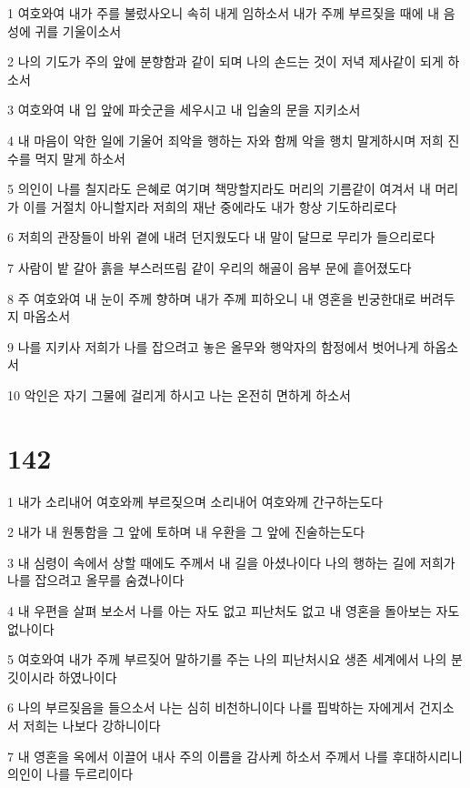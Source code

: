 \par 1 여호와여 내가 주를 불렀사오니 속히 내게 임하소서 내가 주께 부르짖을 때에 내 음성에 귀를 기울이소서
\par 2 나의 기도가 주의 앞에 분향함과 같이 되며 나의 손드는 것이 저녁 제사같이 되게 하소서
\par 3 여호와여 내 입 앞에 파숫군을 세우시고 내 입술의 문을 지키소서
\par 4 내 마음이 악한 일에 기울어 죄악을 행하는 자와 함께 악을 행치 말게하시며 저희 진수를 먹지 말게 하소서
\par 5 의인이 나를 칠지라도 은혜로 여기며 책망할지라도 머리의 기름같이 여겨서 내 머리가 이를 거절치 아니할지라 저희의 재난 중에라도 내가 항상 기도하리로다
\par 6 저희의 관장들이 바위 곁에 내려 던지웠도다 내 말이 달므로 무리가 들으리로다
\par 7 사람이 밭 갈아 흙을 부스러뜨림 같이 우리의 해골이 음부 문에 흩어졌도다
\par 8 주 여호와여 내 눈이 주께 향하며 내가 주께 피하오니 내 영혼을 빈궁한대로 버려두지 마옵소서
\par 9 나를 지키사 저희가 나를 잡으려고 놓은 올무와 행악자의 함정에서 벗어나게 하옵소서
\par 10 악인은 자기 그물에 걸리게 하시고 나는 온전히 면하게 하소서

\chapter{142}

\par 1 내가 소리내어 여호와께 부르짖으며 소리내어 여호와께 간구하는도다
\par 2 내가 내 원통함을 그 앞에 토하며 내 우환을 그 앞에 진술하는도다
\par 3 내 심령이 속에서 상할 때에도 주께서 내 길을 아셨나이다 나의 행하는 길에 저희가 나를 잡으려고 올무를 숨겼나이다
\par 4 내 우편을 살펴 보소서 나를 아는 자도 없고 피난처도 없고 내 영혼을 돌아보는 자도 없나이다
\par 5 여호와여 내가 주께 부르짖어 말하기를 주는 나의 피난처시요 생존 세계에서 나의 분깃이시라 하였나이다
\par 6 나의 부르짖음을 들으소서 나는 심히 비천하니이다 나를 핍박하는 자에게서 건지소서 저희는 나보다 강하니이다
\par 7 내 영혼을 옥에서 이끌어 내사 주의 이름을 감사케 하소서 주께서 나를 후대하시리니 의인이 나를 두르리이다

